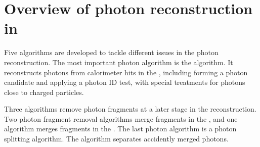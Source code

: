 
\section{Overview of photon reconstruction in \pandora}



Five algorithms are developed to tackle different issues in the photon reconstruction. The most important photon algorithm is the \PhotonReconstruction algorithm. It reconstructs photons from calorimeter hits in the \ECAL, including forming a photon candidate and applying a photon ID test, with special treatments for photons close to charged particles. %


Three algorithms remove photon fragments at a later stage in the reconstruction. Two photon fragment removal algorithms merge fragments in the \ECAL, and one algorithm merges fragments in the \HCAL. The last photon algorithm is a photon splitting algorithm. The algorithm separates accidently merged photons.





